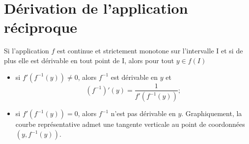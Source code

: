 \section{Dérivation de l'application réciproque}
%
\begin{theo}
  Si l'application $f$ est continue et strictement monotone sur l'intervalle I et si de plus elle est dérivable en tout point de I, alors pour tout $y \in f(I)$
  \begin{itemize}
  \item si $f'(f^{-1}(y)) \neq 0$, alors $f^{-1}$ est dérivable en $y$ et
    \begin{equation}
      \left(f^{-1} \right)'(y)=\frac{1}{f'\left(f^{-1}(y)\right)};
    \end{equation}
  \item si $f'(f^{-1}(y)) = 0$, alors $f^{-1}$ n'est pas dérivable en $y$. Graphiquement, la courbe représentative admet une tangente verticale au point de coordonnées $(y,f^{-1}(y))$.
  \end{itemize}
\end{theo}
